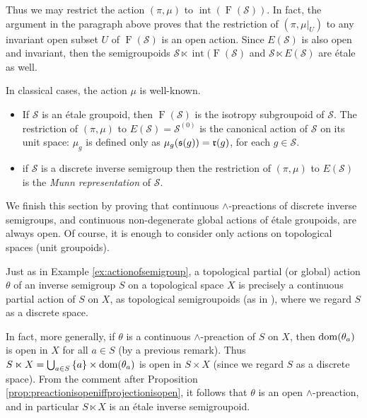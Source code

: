 \begin{example}
    Thus we may restrict the action $(\pi,\mu)$ to $\operatorname{int}(\operatorname{F}(\mathcal{S}))$. In fact, the argument in the paragraph above proves that the restriction of $(\pi,\mu|_U)$ to any invariant open subset $U$ of $\operatorname{F}(\mathcal{S})$ is an open action. Since $E(\mathcal{S})$ is also open and invariant, then the semigroupoids $\mathcal{S}\ltimes\operatorname{int}(\operatorname{F}(\mathcal{S})$ and $\mathcal{S}\ltimes E(\mathcal{S})$ are étale as well.
    
    In classical cases, the action $\mu$ is well-known.
    
    \begin{itemize}
        \item If $\mathcal{S}$ is an étale groupoid, then $\operatorname{F}(\mathcal{S})$ is the isotropy subgroupoid of $\mathcal{S}$. The restriction of $(\pi,\mu)$ to $E(\mathcal{S})=\mathcal{S}^{(0)}$ is the canonical action of $\mathcal{S}$ on its unit space: $\mu_g$ is defined only as $\mu_g(\operatorname{\mathfrak{s}}(g))=\operatorname{\mathfrak{r}}(g)$, for each $g\in\mathcal{S}$.
        \item if $\mathcal{S}$ is a discrete inverse semigroup then the restriction of $(\pi,\mu)$ to $E(\mathcal{S})$ is the \emph{Munn representation} of $\mathcal{S}$.
    \end{itemize}
\end{example}

We finish this section by proving that continuous $\land$-preactions of discrete inverse semigroups, and continuous non-degenerate global actions of étale groupoids, are always open. Of course, it is enough to consider only actions on topological spaces (unit groupoids).

\begin{example}\label{ex:semidirectproductofactionisetale}
Just as in Example \ref{ex:actionofsemigroup}, a topological partial (or global) action $\theta$ of an inverse semigroup $S$ on a topological space $X$ is precisely a continuous partial action of $S$ on $X$, as topological semigroupoids (as in \cite[Definition 2.3]{arxiv1804.00396}), where we regard $S$ as a discrete space.

In fact, more generally, if $\theta$ is a continuous $\land$-preaction of $S$ on $X$, then $\operatorname{dom}(\theta_a)$ is open in $X$ for all $a\in S$ (by a previous remark). Thus $S\ltimes X=\bigcup_{a\in S}\left\{a\right\}\times\operatorname{dom}(\theta_a)$ is open in $S\times X$ (since we regard $S$ as a discrete space). From the comment after Proposition \ref{prop:preactionisopeniffprojectionisopen}, it follows that $\theta$ is an open $\land$-preaction, and in particular $S\ltimes X$ is an étale inverse semigroupoid.
\end{example}

